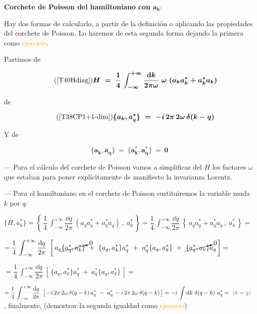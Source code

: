 \vspace{5mm} \textbf{Corchete de Poisson del hamiltoniano con $\boldsymbol{a_k}$}:

Hay dos formas de calcularlo, a partir de la definición o aplicando las propiedades del corchete de Poisson. Lo haremos de esta segunda forma dejando la primera como \textcolor{orange}{ejercicio}.





Partimos de 

\begin{equation}
\tag{\ref{T40Hdiag}}
	\boldsymbol{  
	H \ = \ \dfrac 1{4}\, \int_{-\infty}^{+\infty} \dfrac{\dd k}{2 \pi \omega} \ \omega \ 
(a_ka^*_{k}+a^*_ka_{k}) 
	 }
\end{equation}

de

\begin{equation}
\tag{\ref{T38CP1+1-dim}}
\boldsymbol{ \{a_k,a^*_q\} \ = \ -i\, 2\pi\, 2\omega\, \delta(k-q) } 	
\end{equation}

Y de 

\begin{equation}
\label{T42-a,a-y-a,a^*}	
\ \boldsymbol{
 \{a_k,a_q\} \ = \  \{a^*_k,a^*_q\} \ = \ 0
} 
\end{equation}

--- Para el cálculo del corchete de Poisson vamos a simplificar del $H$ los factores $\omega$ que estaban para poner explícitamente de manifiesto la invarianza Lorentz. 

--- Para el hamiltoniano en el corchete de Poisson sustituiremos la variable muda $k$ por $q$.

$\displaystyle \{H,a_k^*\} = \left\{ \, \dfrac 1{4}\, \int_{-\infty}^{+\infty} \dfrac{\dd q}{2 \pi} \  (a_qa^*_{q}+a^*_qa_{q}) \ , \ a_k^* \, \right\} = 
 \dfrac 1{4}\, \int_{-\infty}^{+\infty} \dfrac{\dd q}{2 \pi} \ \left\{ \, a_qa^*_{q}+a^*_qa_{q} \ , \ a_k^* \, \right\} =  $


$\displaystyle =  \dfrac 1{4}\, \int_{-\infty}^{+\infty} \dfrac{\dd q}{2 \pi} \ \left[ \, 
a_q \cancelto{0}{\{a_q^*,a_k^*\}} \ + \ \{a_q,a_k^*\}a_q^* \ + \ a_q^*\{a_q,a_k^*\} \ + \ \cancelto{0}{\{a_q^*,a_k\}}a_q
\, \right] = $

$\displaystyle =  \dfrac 1{4}\, \int_{-\infty}^{+\infty} \dfrac{\dd q}{2 \pi} \ \left[ \,  \{a_q,a_k^*\}a_q^* \ + \ a_q^*\{a_q,a_k^*\} \, \right]= $

$\displaystyle =
\dfrac 1{4}\, \int_{-\infty}^{+\infty} \dfrac{\dd q}{2 \pi} \ \left[ \,  
-i\, 2\pi\, 2\omega\, \delta(q-k)\, a_q^* \ - \ a_q^*\, -i\, 2\pi\, 2\omega\, \delta(q-k)
 \, \right]= -i\, \int \dd k \ \delta(q-k) \ a^*_q  = \ \textcolor{gris}{ ( k=q ) } \ $, finalmente, (demostrar la segunda igualdad como \textcolor{orange}{ejercicio})
 
